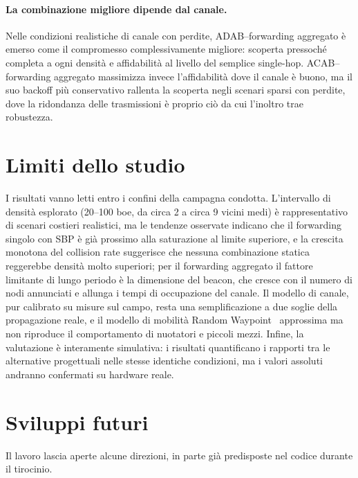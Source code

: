 \paragraph{La combinazione migliore dipende dal canale.} Nelle condizioni
realistiche di canale con perdite, ADAB--forwarding aggregato \`e emerso come
il compromesso complessivamente migliore: scoperta pressoch\'e completa a
ogni densit\`a e affidabilit\`a al livello del semplice single-hop.
ACAB--forwarding aggregato massimizza invece l'affidabilit\`a dove il canale
\`e buono, ma il suo backoff pi\`u conservativo rallenta la scoperta negli
scenari sparsi con perdite, dove la ridondanza delle trasmissioni \`e
proprio ci\`o da cui l'inoltro trae robustezza.

\section{Limiti dello studio}
\label{sec:concl-limiti}
I risultati vanno letti entro i confini della campagna condotta. L'intervallo
di densit\`a esplorato (20--100 boe, da circa 2 a circa 9 vicini medi) \`e
rappresentativo di scenari costieri realistici, ma le tendenze osservate
indicano che il forwarding singolo con SBP \`e gi\`a prossimo alla
saturazione al limite superiore, e la crescita monotona del collision rate
suggerisce che nessuna combinazione statica reggerebbe densit\`a molto
superiori; per il forwarding aggregato il fattore limitante di lungo periodo
\`e la dimensione del beacon, che cresce con il numero di nodi annunciati e
allunga i tempi di occupazione del canale. Il modello di canale, pur
calibrato su misure sul campo, resta una semplificazione a due soglie della
propagazione reale, e il modello di mobilit\`a Random Waypoint~\cite{rwp} approssima ma
non riproduce il comportamento di nuotatori e piccoli mezzi. Infine, la
valutazione \`e interamente simulativa: i risultati quantificano i rapporti
tra le alternative progettuali nelle stesse identiche condizioni, ma i valori
assoluti andranno confermati su hardware reale.

\section{Sviluppi futuri}
\label{sec:concl-futuro}
Il lavoro lascia aperte alcune direzioni, in parte gi\`a predisposte nel
codice durante il tirocinio.


